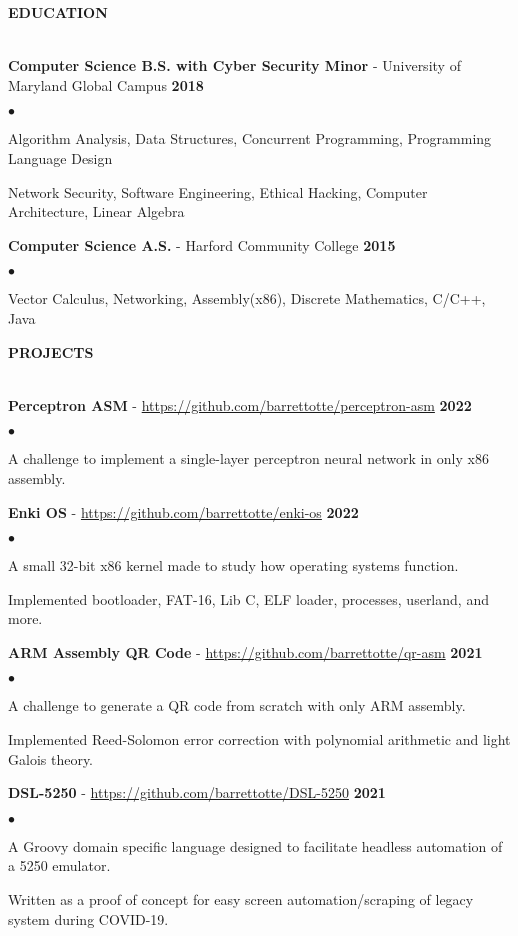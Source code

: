 \documentclass{article}
\newcommand{\lineunder}{
	\vspace*{-4pt}\\ 
	\hspace*{-18pt}\hrulefill \\
}
\newcommand{\header}[1]{
	{\hspace*{-15pt}\vspace*{6pt}\textsc{#1}}\vspace*{-6pt}\lineunder
}
\newcommand{\education}[3]{
	\textbf{#1} - #2 \hfill \textbf{#3} \vspace*{3pt}
}
\newcommand{\project}[3]{
	\vspace*{3pt} \textbf{#1} - \small{\href{#2}{#2}} \hfill \textbf{#3} \vspace*{2pt}
}
\newenvironment{resumelist}{
	\vspace*{2pt}
	\begin{list}
		{\small$\bullet$}{\topsep 0pt \itemsep -2pt}}{\vspace*{4pt}
	\end{list}
}
\newcommand{\resumeheader}[1]{
	\vspace*{10pt}
	\header{\textbf{#1}}
    \vspace*{3pt}
}
\begin{document}
	\resumeheader{EDUCATION}
		\education 
			{Computer Science B.S. with Cyber Security Minor}{University of Maryland Global Campus} 
			{2018}
			\begin{resumelist}
				\item Algorithm Analysis, Data Structures, Concurrent Programming, Programming Language Design
				\item Network Security, Software Engineering, Ethical Hacking, Computer Architecture, Linear Algebra
			\end{resumelist}
			\vspace*{6pt}
		\education
			{Computer Science A.S.}{Harford Community College}
			{2015}
			\begin{resumelist}
				\item Vector Calculus, Networking, Assembly(x86), Discrete Mathematics, C/C++, Java
			\end{resumelist}
	
	\resumeheader{PROJECTS}
		\project
			{Perceptron ASM}{https://github.com/barrettotte/perceptron-asm}
			{2022}
			\begin{resumelist}
				\item A challenge to implement a single-layer perceptron neural network in only x86 assembly.
			\end{resumelist}
		\project
			{Enki OS}{https://github.com/barrettotte/enki-os}
			{2022}
			\begin{resumelist}
				\item A small 32-bit x86 kernel made to study how operating systems function.
				\item Implemented bootloader, FAT-16, Lib C, ELF loader, processes, userland, and more.
			\end{resumelist}
		\project
			{ARM Assembly QR Code}{https://github.com/barrettotte/qr-asm}
			{2021}
			\begin{resumelist}
				\item A challenge to generate a QR code from scratch with only ARM assembly.
				\item Implemented Reed-Solomon error correction with polynomial arithmetic and light Galois theory.
			\end{resumelist}
		\project
			{DSL-5250}{https://github.com/barrettotte/DSL-5250}
			{2021}
			\begin{resumelist}
				\item A Groovy domain specific language designed to facilitate headless automation of a 5250 emulator.
				\item Written as a proof of concept for easy screen automation/scraping of legacy system during COVID-19.
			\end{resumelist}
\end{document}
